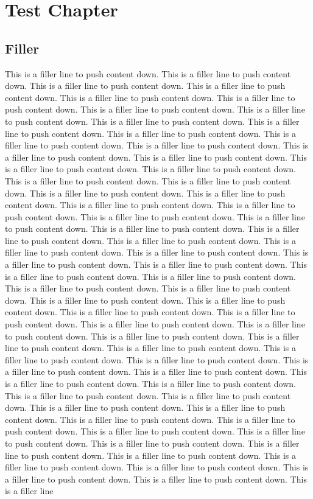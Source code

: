 \documentclass[11pt,a4paper]{report}
\begin{document}
\chapter{Test Chapter}
\section{Filler}
This is a filler line to push content down. This is a filler line to push content down. This is a filler line to push content down. This is a filler line to push content down. This is a filler line to push content down. This is a filler line to push content down. This is a filler line to push content down. This is a filler line to push content down. This is a filler line to push content down. This is a filler line to push content down. This is a filler line to push content down. This is a filler line to push content down. This is a filler line to push content down. This is a filler line to push content down. This is a filler line to push content down. This is a filler line to push content down. This is a filler line to push content down. This is a filler line to push content down. This is a filler line to push content down. This is a filler line to push content down. This is a filler line to push content down. This is a filler line to push content down. This is a filler line to push content down. This is a filler line to push content down. This is a filler line to push content down. This is a filler line to push content down. This is a filler line to push content down. This is a filler line to push content down. This is a filler line to push content down. This is a filler line to push content down. This is a filler line to push content down. This is a filler line to push content down. This is a filler line to push content down. This is a filler line to push content down. This is a filler line to push content down. This is a filler line to push content down. This is a filler line to push content down. This is a filler line to push content down. This is a filler line to push content down. This is a filler line to push content down. This is a filler line to push content down. This is a filler line to push content down. This is a filler line to push content down. This is a filler line to push content down. This is a filler line to push content down. This is a filler line to push content down. This is a filler line to push content down. This is a filler line to push content down. This is a filler line to push content down. This is a filler line to push content down. This is a filler line to push content down. This is a filler line to push content down. This is a filler line to push content down. This is a filler line to push content down. This is a filler line to push content down. This is a filler line to push content down. This is a filler line to push content down. This is a filler line to push content down. This is a filler line to push content down. This is a filler line to push content down. This is a filler line to push content down. This is a filler line to push content down. This is a filler line to push content down. This is a filler line to push content down. This is a filler line to push content down. This is a filler line to push content down. This is a filler line 
\end{document}
